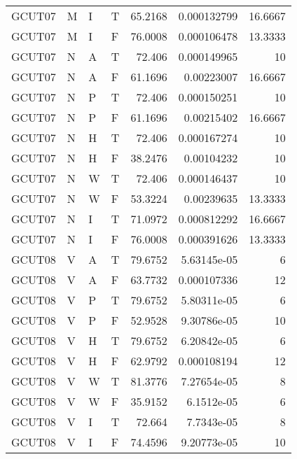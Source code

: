 \begin{longtable}{llllrrr}
    GCUT07   & M     & I     & T          & 65.2168    & 0.000132799 & 16.6667  \\
    GCUT07   & M     & I     & F          & 76.0008    & 0.000106478 & 13.3333  \\
    GCUT07   & N     & A     & T          & 72.406     & 0.000149965 & 10       \\
    GCUT07   & N     & A     & F          & 61.1696    & 0.00223007  & 16.6667  \\
    GCUT07   & N     & P     & T          & 72.406     & 0.000150251 & 10       \\
    GCUT07   & N     & P     & F          & 61.1696    & 0.00215402  & 16.6667  \\
    GCUT07   & N     & H     & T          & 72.406     & 0.000167274 & 10       \\
    GCUT07   & N     & H     & F          & 38.2476    & 0.00104232  & 10       \\
    GCUT07   & N     & W     & T          & 72.406     & 0.000146437 & 10       \\
    GCUT07   & N     & W     & F          & 53.3224    & 0.00239635  & 13.3333  \\
    GCUT07   & N     & I     & T          & 71.0972    & 0.000812292 & 16.6667  \\
    GCUT07   & N     & I     & F          & 76.0008    & 0.000391626 & 13.3333  \\
    GCUT08   & V     & A     & T          & 79.6752    & 5.63145e-05 & 6        \\
    GCUT08   & V     & A     & F          & 63.7732    & 0.000107336 & 12       \\
    GCUT08   & V     & P     & T          & 79.6752    & 5.80311e-05 & 6        \\
    GCUT08   & V     & P     & F          & 52.9528    & 9.30786e-05 & 10       \\
    GCUT08   & V     & H     & T          & 79.6752    & 6.20842e-05 & 6        \\
    GCUT08   & V     & H     & F          & 62.9792    & 0.000108194 & 12       \\
    GCUT08   & V     & W     & T          & 81.3776    & 7.27654e-05 & 8        \\
    GCUT08   & V     & W     & F          & 35.9152    & 6.1512e-05  & 6        \\
    GCUT08   & V     & I     & T          & 72.664     & 7.7343e-05  & 8        \\
    GCUT08   & V     & I     & F          & 74.4596    & 9.20773e-05 & 10       \\

\end{longtable}
